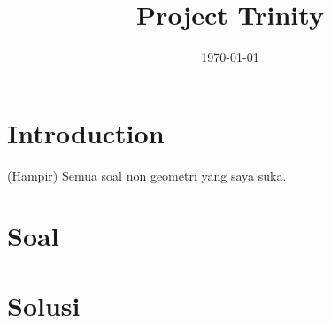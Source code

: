 

\title{Project Trinity}
\date{\today}



\maketitle

\renewcommand*\contentsname{Daftar Isi}
\tableofcontents

\newpage

\section*{Introduction}
(Hampir) Semua soal non geometri yang saya suka. 

\section{Soal}


\newpage
\section{Solusi}



